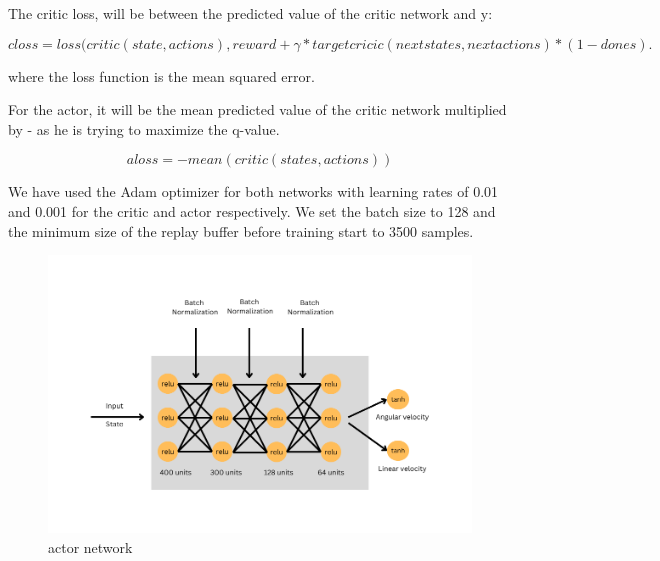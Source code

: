 \documentclass[12pt]{extarticle}
\begin{document}
The critic loss, will be between the predicted value of the critic network and y:

 

     \begin{equation} \label{critic_loss}
     closs= loss(critic(state,actions),reward+ \gamma*targetcricic(nextstates,nextactions)*(1-dones).
   \end{equation}
 
where the loss function is the mean squared error.

For the actor, it will be the mean predicted value of the critic network multiplied by - as  he is trying to maximize the q-value.

\begin{equation} \label{actor_loss}
     aloss= -mean(critic(states,actions))
   \end{equation}
   
We have used the Adam optimizer for both networks with learning rates of 0.01 and 0.001 for the critic and actor respectively. We set the batch size to 128 and the minimum size of the replay buffer before training start to 3500 samples.






    
 \begin{figure}[t]  
\centering
\includegraphics[scale=0.60]{actor_net}
\caption[actor network]{actor network}
\end{figure}
\end{document}
